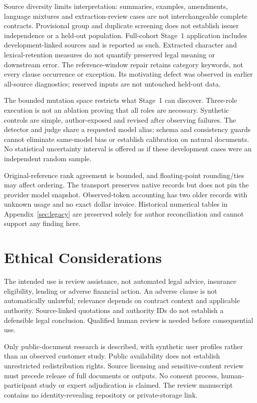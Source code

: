 \documentclass[11pt]{article}
\begin{document}
Source diversity limits interpretation: summaries, examples, amendments,
language mixtures and extraction-review cases are not interchangeable
complete contracts. Provisional group and duplicate screening does not
establish issuer independence or a held-out population. Full-cohort
Stage~1 application includes development-linked sources and is reported
as such. Extracted character and lexical-retention measures do not
quantify preserved legal meaning or downstream error.
The reference-window repair retains category keywords, not every clause
occurrence or exception. Its motivating defect was observed in earlier
all-source diagnostics; reserved inputs are not untouched held-out data.

The bounded mutation space restricts what Stage~1 can discover. Three-role
execution is not an ablation proving that all roles are necessary.
Synthetic controls are simple, author-exposed and revised after observing
failures. The detector and judge share a requested model alias; schema and
consistency guards cannot eliminate same-model bias or establish
calibration on natural documents. No statistical uncertainty interval is
offered as if these development cases were an independent random sample.

Original-reference rank agreement is bounded, and floating-point
rounding/ties may affect ordering. The transport preserves native records
but does not pin the provider model snapshot. Observed-token accounting
has two older records with unknown usage and no exact dollar invoice.
Historical numerical tables in Appendix~\ref{sec:legacy} are preserved
solely for author reconciliation and cannot support any finding here.

\section*{Ethical Considerations}
The intended use is review assistance, not automated legal advice,
insurance eligibility, lending or adverse financial action. An adverse
clause is not automatically unlawful; relevance depends on contract
context and applicable authority. Source-linked quotations and authority
IDs do not establish a defensible legal conclusion. Qualified human
review is needed before consequential use.

Only public-document research is described, with synthetic user profiles
rather than an observed customer study. Public availability does not
establish unrestricted redistribution rights. Source licensing and
sensitive-content review must precede release of full documents or
outputs. No consent process, human-participant study or expert
adjudication is claimed. The review manuscript contains no
identity-revealing repository or private-storage link.
\end{document}
